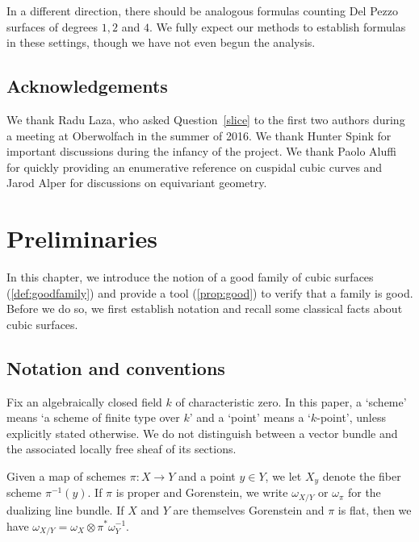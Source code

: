 \documentclass[12pt,reqno]{amsart}
\renewcommand{\k}{k}
\renewcommand{\to}{{\longrightarrow}}
\numberwithin{equation}{section}
\begin{document}
In a different direction, there should be analogous formulas counting
Del Pezzo surfaces of degrees $1,2$ and $4$.  We fully expect our
methods to establish formulas in these settings, though we have not
even begun the analysis.  



\subsection{Acknowledgements}
We thank Radu Laza, who asked Question~\ref{slice} to the first two
authors during a meeting at Oberwolfach in the summer of 2016.  We
thank Hunter Spink for important discussions during the infancy
of the project.  We thank Paolo Aluffi for quickly providing an
enumerative reference on cuspidal cubic curves and Jarod Alper for discussions on equivariant geometry.



  




\section{Preliminaries}
\label{sec:good}

In this chapter, we introduce the notion of a good family of cubic
surfaces (\autoref{def:goodfamily}) and provide a tool
(\autoref{prop:good}) to verify that a family is good.  Before we do
so, we first establish notation and recall some classical facts about
cubic surfaces.

\subsection{Notation and conventions}
\label{sec:notation-conventions}
Fix an algebraically closed field $\k$ of characteristic zero.  In
this paper, a `scheme' means `a scheme of finite type over $\k$' and a
`point' means a `$\k$-point', unless explicitly stated otherwise.  We
do not distinguish between a vector bundle and the associated locally
free sheaf of its sections.

Given a map of schemes $\pi \colon X \to Y$ and a point $y \in Y$, we
let $X_y$ denote the fiber scheme $\pi^{-1}(y)$.  If $\pi$ is proper
and Gorenstein, we write $\omega_{X/Y}$ or $\omega_\pi$ for the
dualizing line bundle.  If $X$ and $Y$ are themselves Gorenstein and
$\pi$ is flat, then we have
$\omega_{X/Y} = \omega_X \otimes \pi^*\omega_Y^{-1}$.
\end{document}

